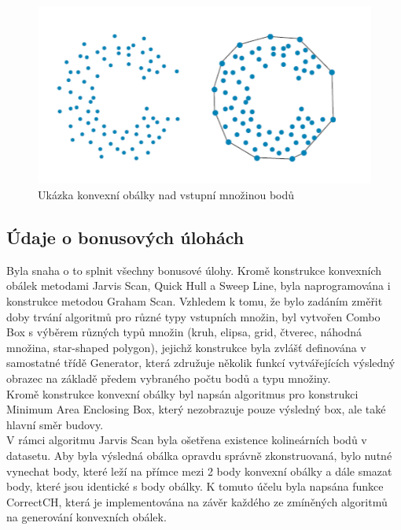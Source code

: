 \documentclass[a4paper,11pt,twoside]{article}
\begin{document}
\vspace{0.2cm}
\begin{figure}[hbt!] 
\begin{center}
\includegraphics[width=15cm]{pictures/convex.png} 
\caption[Ukázka konvexní obálky nad vstupní množinou bodů]{Ukázka konvexní obálky nad vstupní množinou bodů \cite{convex}}
\label{fig:convex}
\end{center}
\end{figure}
\vspace{-0.4cm}

\subsection{Údaje o bonusových úlohách}
\large
\noindent Byla snaha o to splnit všechny bonusové úlohy. Kromě konstrukce konvexních obálek metodami Jarvis Scan, Quick Hull a Sweep Line, byla naprogramována i konstrukce metodou Graham Scan. Vzhledem k tomu, že bylo zadáním změřit doby trvání algoritmů pro různé typy vstupních množin, byl vytvořen Combo Box s výběrem různých typů množin (kruh, elipsa, grid, čtverec, náhodná množina, star-shaped polygon), jejichž konstrukce byla zvlášť definována v samostatné třídě Generator, která združuje několik funkcí vytvářejících výsledný obrazec na základě předem vybraného počtu bodů a typu množiny. \\
\indent Kromě konstrukce konvexní obálky byl napsán algoritmus pro konstrukci Minimum Area Enclosing Box, který nezobrazuje pouze výsledný box, ale také hlavní směr budovy. \\
\indent V rámci algoritmu Jarvis Scan byla ošetřena existence kolineárních bodů v datasetu. Aby byla výsledná obálka opravdu správně zkonstruovaná, bylo nutné vynechat body, které leží na přímce mezi 2 body konvexní obálky a dále smazat body, které jsou identické s body obálky. K tomuto účelu byla napsána funkce CorrectCH, která je implementována na závěr každého ze zmíněných algoritmů na generování konvexních obálek.
\end{document}
